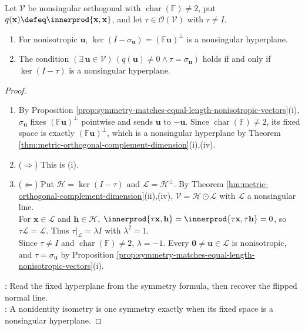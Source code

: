 \begin{proposition} \label{prop:symmetries-fixed-hyperplanes} \\
Let $\mathcal{V}$ be nonsingular orthogonal with $\operatorname{char}(\mathbb{F})\neq2$, put $q(\mathbf{x})\defeq\innerprod{\mathbf{x},\mathbf{x}}$, and let $\tau\in\mathcal{O}(\mathcal{V})$ with $\tau\neq I$.
\begin{enumerate}[label=(\roman*)]
\setlength{\itemsep}{0pt}
\item For nonisotropic $\mathbf{u}$, $\ker(I-\sigma_{\mathbf{u}})=(\mathbb{F}\mathbf{u})^{\perp}$ is a nonsingular hyperplane.
\item The condition $(\exists\,\mathbf{u}\in\mathcal{V})\,(q(\mathbf{u})\neq0\wedge\tau=\sigma_{\mathbf{u}})$ holds if and only if $\ker(I-\tau)$ is a nonsingular hyperplane.
\end{enumerate}
\begin{proof}
\begin{enumerate}[label=(\roman*)]
\setlength{\itemsep}{0pt}
\item[$(i)$] By Proposition \ref{prop:symmetry-matches-equal-length-nonisotropic-vectors}(i), $\sigma_{\mathbf{u}}$ fixes $(\mathbb{F}\mathbf{u})^{\perp}$ pointwise and sends $\mathbf{u}$ to $-\mathbf{u}$. Since $\operatorname{char}(\mathbb{F})\neq2$, its fixed space is exactly $(\mathbb{F}\mathbf{u})^{\perp}$, which is a nonsingular hyperplane by Theorem \ref{thm:metric-orthogonal-complement-dimension}(i),(iv).
\item[$(ii)$] ($\Rightarrow$) This is (i).
\item[$(ii)$] ($\Leftarrow$) Put $\mathcal{H}=\ker(I-\tau)$ and $\mathcal{L}=\mathcal{H}^{\perp}$. By Theorem \ref{hm:metric-orthogonal-complement-dimension}(ii),(iv), $\mathcal{V}=\mathcal{H}\odot\mathcal{L}$ with $\mathcal{L}$ a nonsingular line.\\
For $\mathbf{x}\in\mathcal{L}$ and $\mathbf{h}\in\mathcal{H}$, $\innerprod{\tau\mathbf{x},\mathbf{h}}=\innerprod{\tau\mathbf{x},\tau\mathbf{h}}=0$, so $\tau\mathcal{L}=\mathcal{L}$. Thus $\tau|_{\mathcal{L}}=\lambda I$ with $\lambda^2=1$.\\
Since $\tau\neq I$ and $\operatorname{char}(\mathbb{F})\neq2$, $\lambda=-1$. Every $\mathbf{0}\neq\mathbf{u}\in\mathcal{L}$ is nonisotropic, and $\tau=\sigma_{\mathbf{u}}$ by Proposition \ref{prop:symmetry-matches-equal-length-nonisotropic-vectors}(i).
\end{enumerate}
: Read the fixed hyperplane from the symmetry formula, then recover the flipped normal line.\\
: A nonidentity isometry is one symmetry exactly when its fixed space is a nonsingular hyperplane.
\end{proof}
\end{proposition}

